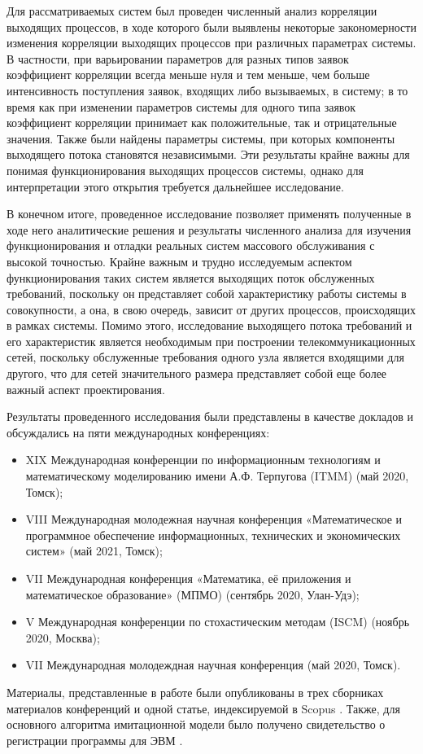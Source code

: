 Для рассматриваемых систем был проведен численный анализ корреляции выходящих процессов, в ходе которого были выявлены некоторые закономерности изменения корреляции выходящих процессов при различных параметрах системы. В частности, при варьировании параметров для разных типов заявок коэффициент корреляции всегда меньше нуля и тем меньше, чем больше интенсивность поступления заявок, входящих либо вызываемых, в систему; в то время как при изменении параметров системы для одного типа заявок коэффициент корреляции принимает как положительные, так и отрицательные значения. Также были найдены параметры системы, при которых компоненты выходящего потока становятся независимыми. Эти результаты крайне важны для понимая функционирования выходящих процессов системы, однако для интерпретации этого открытия требуется дальнейшее исследование.

В конечном итоге, проведенное исследование позволяет применять полученные в ходе него аналитические решения и результаты численного анализа  для изучения функционирования и отладки реальных систем массового обслуживания \cite{deering1991icmp,nutt1982performance} с высокой точностью. Крайне важным и трудно исследуемым аспектом функционирования таких систем является выходящих поток обслуженных требований, поскольку он представляет собой характеристику работы системы в совокупности, а она, в свою очередь, зависит от других процессов, происходящих в рамках системы. Помимо этого, исследование выходящего потока требований и его характеристик является необходимым при построении телекоммуникационных сетей, поскольку обслуженные требования одного узла является входящими для другого, что для сетей значительного размера представляет собой еще более важный аспект проектирования.

Результаты проведенного исследования были представлены в качестве докладов и обсуждались на пяти международных конференциях:
\begin{itemize}
\item XIX Международная конференции по информационным технологиям и математическому моделированию имени А.Ф. Терпугова (ITMM) (май 2020, Томск);
\item VIII Международная молодежная научная конференция «Математическое и программное обеспечение информационных, технических и экономических систем» (май 2021, Томск);
\item VII Международная конференция «Математика, её приложения и математическое образование» (МПМО) (сентябрь 2020, Улан-Удэ);
\item V Международная конференции по стохастическим методам (ISCM) (ноябрь 2020, Москва);
\item VII Международная молодеждная научная конференция  (май 2020, Томск).
\end{itemize}
Материалы, представленные в работе были опубликованы в трех сборниках материалов конференций \cite{itmm_2021,icsm,mpmo} и одной статье, индексируемой в Scopus \cite{blaginin2020two}. Также, для основного алгоритма имитационной модели было получено свидетельство о регистрации программы для ЭВМ \cite{evm}.
 \clearpage